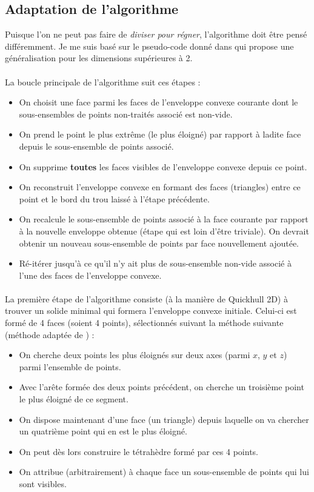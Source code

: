 \documentclass[]{article}
\begin{document}
\subsection{Adaptation de l'algorithme}

Puisque l'on ne peut pas faire de \emph{diviser pour régner}, l'algorithme doit être pensé différemment. Je me suis basé sur le pseudo-code donné dans \cite{10.1145/235815.235821} qui propose une généralisation pour les dimensions supérieures à 2.

\paragraph{}
La boucle principale de l'algorithme suit ces étapes :
\begin{itemize}
	\item On choisit une face parmi les faces de l'enveloppe convexe courante dont le sous-ensembles de points non-traités associé est non-vide.
	\item On prend le point le plus extrême (le plus éloigné) par rapport à ladite face depuis le sous-ensemble de points associé.
	\item On supprime \textbf{toutes} les faces visibles de l'enveloppe convexe depuis ce point.
	\item On reconstruit l'enveloppe convexe en formant des faces (triangles) entre ce point et le bord du trou laissé à l'étape précédente.
	\item On recalcule le sous-ensemble de points associé à la face courante par rapport à la nouvelle enveloppe obtenue (étape qui est loin d'être triviale). On devrait obtenir un nouveau sous-ensemble de points par face nouvellement ajoutée.
	\item Ré-itérer jusqu'à ce qu'il n'y ait plus de sous-ensemble non-vide associé à l'une des faces de l'enveloppe convexe.
\end{itemize}

\paragraph{}
La première étape de l'algorithme consiste (à la manière de Quickhull 2D) à trouver un solide minimal qui formera l'enveloppe convexe initiale. Celui-ci est formé de 4 faces (soient 4 points), sélectionnés suivant la méthode suivante (méthode adaptée de \cite{smith}) :
\begin{itemize}
	\item On cherche deux points les plus éloignés sur deux axes (parmi $x$, $y$ et $z$) parmi l'ensemble de points.
	\item Avec l'arête formée des deux points précédent, on cherche un troisième point le plus éloigné de ce segment.
	\item On dispose maintenant d'une face (un triangle) depuis laquelle on va chercher un quatrième point qui en est le plus éloigné.
	\item On peut dès lors construire le tétrahèdre formé par ces 4 points.
	\item On attribue (arbitrairement) à chaque face un sous-ensemble de points qui lui sont visibles.
\end{itemize}
\end{document}
